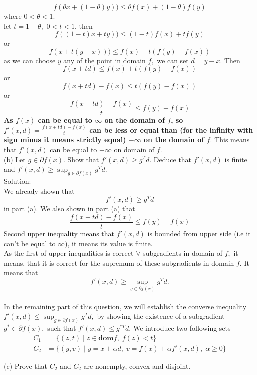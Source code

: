\documentclass{article}
\begin{document}
$$
f(\theta x + (1 - \theta) y)) \leq 
\theta f(x) + (1 - \theta) f(y)
$$
where $0 < \theta < 1.$ \\
let $t = 1 - \theta,$ $0 < t < 1.$
then
$$
f((1 - t) x + t y)) \leq 
(1 - t)f(x) + tf(y)
$$
or
$$
f(x + t (y - x))) \leq 
f(x) + t(f(y) - f(x))
$$
as we can choose $y$ any of the point in domain $f,$ we can set $d = y - x.$ Then
$$
f(x + t d) \leq 
f(x) + t(f(y) - f(x))
$$
or
$$
f(x + t d) - f(x)\leq 
t(f(y) - f(x))
$$
or
$$
\frac{f(x + t d) - f(x)}{t}\leq 
f(y) - f(x)
$$
\textbf{As $f(x)$ can be equal to $\infty$ on the domain of $f$, so
$f'(x, d) = \frac{f(x + t d) - f(x)}{t}$ can be less or equal than (for the infinity with sign minus it means strictly equal) $- \infty$ on the domain of $f.$} This means that $f'(x, d)$ can be equal to $- \infty$ on domain of $f.$\\

(b) Let $g \in \partial f(x).$ Show that 
$f'(x, d) \geq g^T d.$ Deduce that $f'(x, d)$ is finite and $f'(x, d) \geq \sup_{g \in \partial f(x)} g^T d.$ \\

Solution:\\
We already shown that 
$$f'(x, d) \geq g^T d$$
in part (a).
We also shown in part (a) that 
$$
\frac{f(x + t d) - f(x)}{t}\leq 
f(y) - f(x)
$$
Second upper inequality means that  $f'(x, d)$ is bounded from upper side (i.e it can't be equal to $\infty$), it means  its value is finite. \\
As the first of upper inequalities is correct $\forall$ subgradients in domain of $f,$ it means, that it is correct for  the supremum of these subgradients in domain $f.$ It means that 
$$f'(x, d) \geq \sup_{g \in \partial f(x)} g^T d.$$
\\

In the remaining part of this question, we will establish the converse inequality $f'(x, d) \leq \sup_{g \in \partial f(x)} g^T d,$ by showing the existence of a subgradient $g^* \in \partial f(x), $ such that 
$f'(x, d) \leq g^{*T} d.$ We introduce two following sets
\begin{align*}
	C_1 &= \{(z,t) \; |\; z \in \mathbf{dom} f, \; f(z) < t \} \\
	C_2 &= \{(y, v) \; | \; y = x + \alpha d, \;
	v = f(x) + \alpha f'(x, d), \; \alpha \geq 0 \}
\end{align*}

(c) Prove that $C_2$ and $C_2$ are nonempty, convex and disjoint.\\
\end{document}
